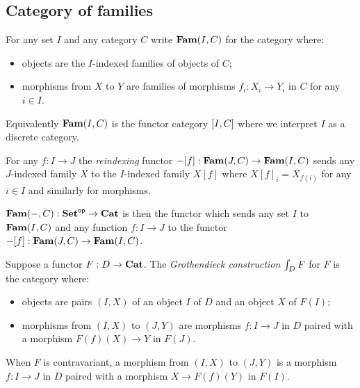 
\subsection{Category of families}

\begin{definition}
For any set $I$ and any category $C$ write $\mathbf{Fam}(I,C)$ for the category where:
\begin{itemize}
\item objects are the $I$-indexed families of objects of $C$;
\item morphisms from $X$ to $Y$ are families of morphisms $f_i: X_i \to Y_i$ in $C$ for any $i \in I$.
\end{itemize}
\end{definition}

\noindent Equivalently $\mathbf{Fam}(I,C)$ is the functor category $[I,C]$ where we interpret $I$ as a discrete
category.

\begin{definition}[Reindexing]
For any $f: I \to J$ the \emph{reindexing} functor $-[f]: \mathbf{Fam}(J,C) \to \mathbf{Fam}(I,C)$ sends any
$J$-indexed family $X$ to the $I$-indexed family $X[f]$ where $X[f]_i = X_{f(i)}$ for any $i \in I$ and
similarly for morphisms.
\end{definition}

\begin{definition}
$\mathbf{Fam}(-,C): \mathbf{Set}^{\mathsf{op}} \to \mathbf{Cat}$ is then the functor which sends any set $I$ to $\mathbf{Fam}(I,C)$ and any function
$f: I \to J$ to the functor $-[f]: \mathbf{Fam}(J,C) \to \mathbf{Fam}(I,C)$.
\end{definition}

\begin{definition}
Suppose a functor $F: D \to \mathbf{Cat}$. The \emph{Grothendieck construction} $\int_{D}F$ for $F$ is the
category where:
\begin{itemize}
\item objects are pairs $(I, X)$ of an object $I$ of $D$ and an object $X$ of $F(I)$;
\item morphisms from $(I, X)$ to $(J, Y)$ are morphisms $f: I \to J$ in $D$ paired with a morphism $F(f)(X)
\to Y$ in $F(J)$.
\end{itemize}
\end{definition}

\noindent When $F$ is contravariant, a morphism from $(I, X)$ to $(J, Y)$ is a morphism $f: I \to J$ in $D$
paired with a morphism $X \to F(f)(Y)$ in $F(I)$.

